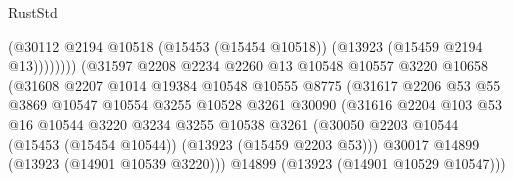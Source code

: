 \begin{lexlean}{RustStd}
\begin{coremodule}
                                            (@30112
                                              @2194
                                              @10518
                                              (@15453 (@15454 @10518))
                                              (@13923 (@15459 @2194 @13))))))))
                                  (@31597
                                    @2208
                                    @2234
                                    @2260
                                    @13
                                    @10548
                                    @10557
                                    @3220
                                    @10658
                                    (@31608
                                      @2207
                                      @1014
                                      @19384
                                      @10548
                                      @10555
                                      @8775
                                      (@31617
                                        @2206
                                        @53
                                        @55
                                        @3869
                                        @10547
                                        @10554
                                        @3255
                                        @10528
                                        @3261
                                        @30090
                                        (@31616
                                          @2204
                                          @103
                                          @53
                                          @16
                                          @10544
                                          @3220
                                          @3234
                                          @3255
                                          @10538
                                          @3261
                                          (@30050
                                            @2203
                                            @10544
                                            (@15453 (@15454 @10544))
                                            (@13923 (@15459 @2203 @53)))
                                          @30017
                                          @14899
                                          (@13923 (@14901 @10539 @3220)))
                                        @14899
                                        (@13923 (@14901 @10529 @10547)))

\end{coremodule}
\end{lexlean}

